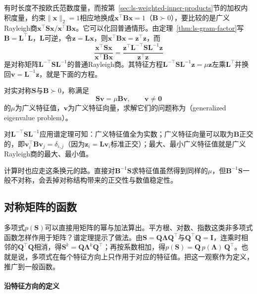 有时长度不按欧氏范数度量，而按第~\ref{sec:ls-weighted-inner-products}节的加权内积度量，约束$\lVert\bm x\rVert_2=1$相应地换成$\bm x^\top\bm B\bm x=1$（$\bm B\succ0$），要比较的是广义Rayleigh商$\bm x^\top\bm S\bm x/\bm x^\top\bm B\bm x$。它可以化回普通情形。由定理~\ref{thm:ls-gram-factor}写$\bm B=\bm L^\top\bm L$，$\bm L$可逆，令$\bm z=\bm L\bm x$，则$\bm x^\top\bm B\bm x=\bm z^\top\bm z$，而
\[
 \frac{\bm x^\top\bm S\bm x}{\bm x^\top\bm B\bm x}
 =\frac{\bm z^\top\bm L^{-\top}\bm S\bm L^{-1}\bm z}{\bm z^\top\bm z}
\]
是对称矩阵$\bm L^{-\top}\bm S\bm L^{-1}$的普通Rayleigh商。其特征方程$\bm L^{-\top}\bm S\bm L^{-1}\bm z=\mu\bm z$左乘$\bm L^\top$并换回$\bm v=\bm L^{-1}\bm z$，就是下面的方程。
\begin{definition}[广义特征值]
\label{def:matrix-analysis-generalized-eigenvalue}
对实对称$\bm S$与$\bm B\succ0$，称满足
\begin{equation}
 \bm S\bm v=\mu\bm B\bm v,\qquad\bm v\neq\bm0
 \label{eq:matrix-analysis-generalized-eigenproblem}
\end{equation}
的$\mu$为广义特征值，$\bm v$为广义特征向量，求解它们的问题称为（generalized eigenvalue problem）。
\end{definition}
对$\bm L^{-\top}\bm S\bm L^{-1}$应用谱定理可知：广义特征值全为实数；广义特征向量可以取为$\bm B$正交的，即$\bm v_i^\top\bm B\bm v_j=\delta_{i,j}$（因为$\bm z_i=\bm L\bm v_i$标准正交）；最大、最小广义特征值就是广义Rayleigh商的最大、最小值。

计算时也应走这条换元的路。直接对$\bm B^{-1}\bm S$求特征值虽然得到同样的$\mu$，但$\bm B^{-1}\bm S$一般不对称，会丢掉对称结构带来的正交性与数值稳定性。

\subsection{对称矩阵的函数}
\label{sec:ls-matrix-functions}
\label{sec:matrix-analysis-functions-structured-operations}

多项式$p(\bm S)$可以直接用矩阵的幂与加法算出。平方根、对数、指数这类非多项式函数怎样作用于矩阵？谱定理提示了做法。由$\bm S=\bm Q\bm\Lambda\bm Q^\top$与$\bm Q^\top\bm Q=\bm I$，连乘时相邻的$\bm Q^\top\bm Q$相消，得$\bm S^k=\bm Q\bm\Lambda^k\bm Q^\top$；再按系数相加，得$p(\bm S)=\bm Q\,p(\bm\Lambda)\,\bm Q^\top$。也就是说，多项式在每个特征方向上只作用于对应的特征值。把这一观察作为定义，推广到一般函数。

\paragraph{沿特征方向的定义}

